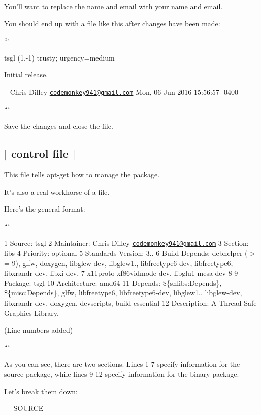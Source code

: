 You'll want to replace the name and email with your name and email.

You should end up with a file like this after changes have been made\-:

```

tsgl (1.-\/1) trusty; urgency=medium


\begin{DoxyItemize}
\item Initial release.
\end{DoxyItemize}

-- Chris Dilley \href{mailto:codemonkey941@gmail.com}{\tt codemonkey941@gmail.\-com} Mon, 06 Jun 2016 15\-:56\-:57 -\/0400

```

Save the changes and close the file. 

 \subsection*{$\vert$ control file $\vert$ }

This file tells apt-\/get how to manage the package.

It's also a real workhorse of a file.

Here's the general format\-:

```

1 Source\-: tsgl 2 Maintainer\-: Chris Dilley \href{mailto:codemonkey941@gmail.com}{\tt codemonkey941@gmail.\-com} 3 Section\-: libs 4 Priority\-: optional 5 Standards-\/\-Version\-: 3.. 6 Build-\/\-Depends\-: debhelper ($>$= 9), glfw, doxygen, libglew-\/dev, libglew1., libfreetype6-\/dev, libfreetype6, libxrandr-\/dev, libxi-\/dev, 7 x11proto-\/xf86vidmode-\/dev, libglu1-\/mesa-\/dev 8 9 Package\-: tsgl 10 Architecture\-: amd64 11 Depends\-: \$\{shlibs\-:Depends\}, \$\{misc\-:Depends\}, glfw, libfreetype6, libfreetype6-\/dev, libglew1., libglew-\/dev, libxrandr-\/dev, doxygen, devscripts, build-\/essential 12 Description\-: A Thread-\/\-Safe Graphics Library.

(Line numbers added)

```

As you can see, there are two sections. Lines 1-\/7 specify information for the source package, while lines 9-\/12 specify information for the binary package.

Let's break them down\-:

-\/---S\-O\-U\-R\-C\-E-\/---


